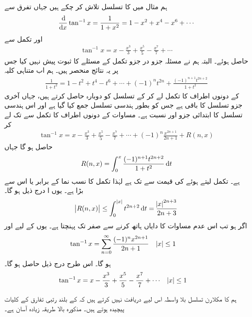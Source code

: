 ہم مثال  میں  کا تسلسل تلاش کر چکے ہیں جہاں تفرق سے
\begin{align*}
\frac{\dif}{\dif x}\tan^{-1}x=\frac{1}{1+x^2}=1-x^2+x^4-x^6+\cdots
\end{align*}
اور تکمل سے
\begin{align*}
\tan^{-1}x=x-\frac{x^3}{3}+\frac{x^5}{5}-\frac{x^7}{7}+\cdots
\end{align*}
حاصل ہوئے۔ البتہ ہم نے مسئلہ جزو در جزو تکمل کے مسئلے  کا ثبوت پیش نہیں کیا  جس پر یہ نتائج منحصر ہیں۔ ہم اب متناہی کلیہ
\begin{align}\label{مساوات_تسلسل_الٹ_ٹینجنٹ_الف}
\frac{1}{1+t^2}=1-t^2+t^4-t^6+\cdots+(-1)^nt^{2n}+\frac{(-1)^{n+1}t^{2n+2}}{1+t^2}
\end{align}
کے دونوں اطراف کا تکمل لے کر    کے تسلسل کو دوبارہ حاصل کرتے ہیں، جہاں آخری جزو تسلسل کا باقی ہے جس  کو بطور  ہندسی تسلسل جمع کیا گیا ہے اور اس ہندسی  تسلسل کا ابتدائی جزو  اور  نسبت   ہے۔ مساوات  کے دونوں اطراف کا تکمل  سے   تک  لے کر
\begin{align*}
\tan^{-1}x=x-\frac{x^3}{3}+\frac{x^5}{5}-\frac{x^7}{7}+\cdots+(-1)^n\frac{x^{2n+1}}{2n+1}+R(n,x)
\end{align*}
حاصل ہو گا جہاں 
\begin{align*}
R(n,x)=\int_0^x \frac{(-1)^{n+1}t^{2n+2}}{1+t^2}\dif t
\end{align*}
ہے۔ تکمل لیتے ہوئے  کی قیمت  سے   تک ہے  لہٰذا تکمل کا نسب نما  کے برابر یا اس سے بڑا ہے۔ یوں ا درج ذیل ہو گا۔
\begin{align*}
\abs{R(n,x)}\le \int_0^{\,\abs{x}}t^{2n+2}\dif t=\frac{\abs{x}^{2n+3}}{2n+3}
\end{align*}
اگر  ہو تب اس عدم مساوات کا دایاں ہاتھ  کرنے سے  صفر تک پہنچتا ہے۔ یوں  کے لیے   اور
\begin{align*}
\tan^{-1}x&=\sum_{n=0}^{\infty}\frac{(-1)^nx^{2n+1}}{2n+1}&&\abs{x}\le 1
\end{align*}
ہو گا۔ اس طرح درج ذیل حاصل ہو گا۔
\begin{align}\label{مساوات_تسلسل_الٹ_ٹینجنٹ_کلیہ}
\tan^{-1}x&=x-\frac{x^3}{3}+\frac{x^5}{5}-\frac{x^7}{7}+\cdots&&\abs{x}\le 1
\end{align}

ہم  کا مکلارن تسلسل بلا واسطہ اس لیے دریافت نہیں کرتے ہیں کہ  کے بلند رتبی تفارق کے کلیات پیچیدہ ہوتے ہیں۔ مذکورہ بالا طریقہ زیادہ آسان ہے۔


